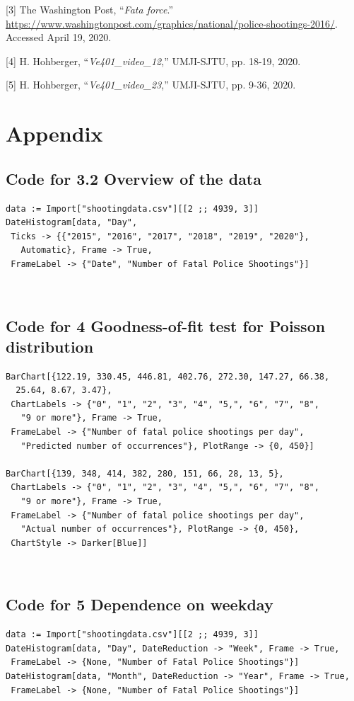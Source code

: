 \documentclass[a4paper]{article}
\begin{document}
[3] The Washington Post, “\textit{Fata force}.” \url{https://www.washingtonpost.com/graphics/national/police-shootings-2016/}. Accessed April 19, 2020.

[4] H. Hohberger, “\textit{Ve401\_video\_12},” UMJI-SJTU, pp. 18-19, 2020.

[5] H. Hohberger, “\textit{Ve401\_video\_23},” UMJI-SJTU, pp. 9-36, 2020.

\newpage

\section{Appendix}
	\subsection{Code for 3.2 Overview of the data}
\begin{lstlisting}
data := Import["shootingdata.csv"][[2 ;; 4939, 3]]
DateHistogram[data, "Day", 
 Ticks -> {{"2015", "2016", "2017", "2018", "2019", "2020"}, 
   Automatic}, Frame -> True, 
 FrameLabel -> {"Date", "Number of Fatal Police Shootings"}]
\end{lstlisting}
\

	\subsection{Code for 4 Goodness-of-fit test for Poisson distribution}
\begin{lstlisting}
BarChart[{122.19, 330.45, 446.81, 402.76, 272.30, 147.27, 66.38, 
  25.64, 8.67, 3.47}, 
 ChartLabels -> {"0", "1", "2", "3", "4", "5,", "6", "7", "8", 
   "9 or more"}, Frame -> True, 
 FrameLabel -> {"Number of fatal police shootings per day", 
   "Predicted number of occurrences"}, PlotRange -> {0, 450}]

BarChart[{139, 348, 414, 382, 280, 151, 66, 28, 13, 5}, 
 ChartLabels -> {"0", "1", "2", "3", "4", "5,", "6", "7", "8", 
   "9 or more"}, Frame -> True, 
 FrameLabel -> {"Number of fatal police shootings per day", 
   "Actual number of occurrences"}, PlotRange -> {0, 450}, 
 ChartStyle -> Darker[Blue]]
\end{lstlisting}
\

	\subsection{Code for 5 Dependence on weekday}
\begin{lstlisting}
data := Import["shootingdata.csv"][[2 ;; 4939, 3]]
DateHistogram[data, "Day", DateReduction -> "Week", Frame -> True, 
 FrameLabel -> {None, "Number of Fatal Police Shootings"}]
DateHistogram[data, "Month", DateReduction -> "Year", Frame -> True, 
 FrameLabel -> {None, "Number of Fatal Police Shootings"}]
\end{lstlisting}
\end{document}
